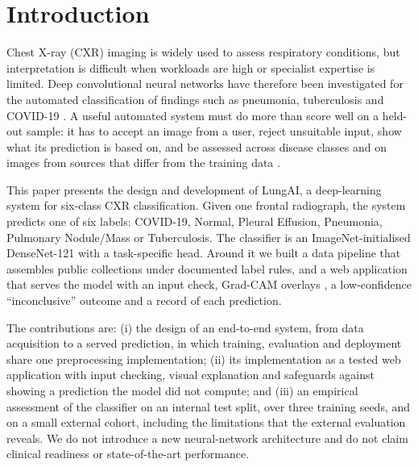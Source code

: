 \section{Introduction}
Chest X-ray (CXR) imaging is widely used to assess respiratory conditions, but interpretation is
difficult when workloads are high or specialist expertise is limited. Deep convolutional neural networks
have therefore been investigated for the automated classification of findings such as pneumonia,
tuberculosis and COVID-19 \cite{rajpurkar2017chexnet,wang2017chestxray8,jaeger2014two,cohen2020covid}.
A useful automated system must do more than score well on a held-out sample: it has to accept an image
from a user, reject unsuitable input, show what its prediction is based on, and be assessed across
disease classes and on images from sources that differ from the training data \cite{zech2018variable}.

This paper presents the design and development of LungAI, a deep-learning system for six-class CXR
classification. Given one frontal radiograph, the system predicts one of six labels: COVID-19, Normal,
Pleural Effusion, Pneumonia, Pulmonary Nodule/Mass or Tuberculosis. The classifier is an
ImageNet-initialised DenseNet-121 with a task-specific head. Around it we built a data pipeline that
assembles public collections under documented label rules, and a web application that serves the model
with an input check, Grad-CAM overlays \cite{selvaraju2017gradcam}, a low-confidence ``inconclusive''
outcome and a record of each prediction.

The contributions are:
(i) the design of an end-to-end system, from data acquisition to a served prediction, in which training,
evaluation and deployment share one preprocessing implementation;
(ii) its implementation as a tested web application with input checking, visual explanation and
safeguards against showing a prediction the model did not compute; and
(iii) an empirical assessment of the classifier on an internal test split, over three training seeds,
and on a small external cohort, including the limitations that the external evaluation reveals.
We do not introduce a new neural-network architecture and do not claim clinical readiness or
state-of-the-art performance.
